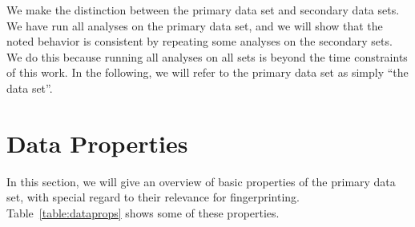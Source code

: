 \documentclass[
    fontsize=12pt,
    headings=small,
    parskip=half,
    bibliography=totoc,
    numbers=noenddot,
    open=any
    ]{scrreprt}
\begin{document}
We make the distinction between the primary data set and secondary data sets.
We have run all analyses on the primary data set, and we will show
that the noted behavior is consistent by repeating some analyses
on the secondary sets.
We do this because running all analyses on all sets is beyond the time
constraints of this work.
In the following, we will refer to the primary data set as simply ``the data set''.

\section{Data Properties}
\label{section:data_properties}
In this section, we will give an overview of basic properties of the primary data set,
with special regard to their relevance for fingerprinting.
Table~\ref{table:dataprops} shows some of these properties.
\end{document}
